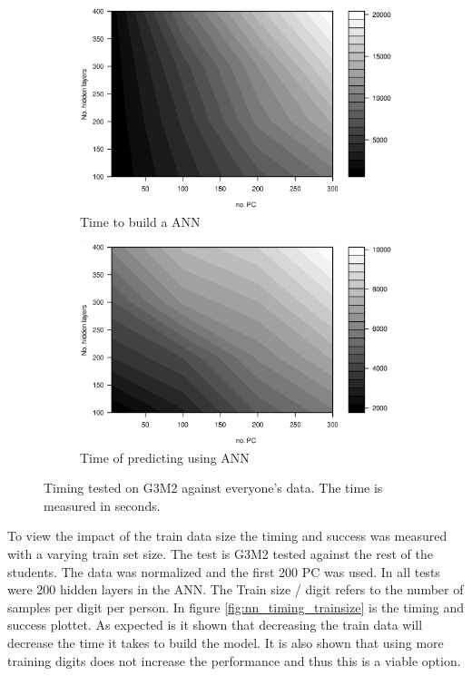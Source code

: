 \begin{figure}[h]
    \begin{subfigure}{0.49\textwidth}
    \centering
        \includegraphics[width=\textwidth]{graphics/contour_nn_size_vs_pca_model}
        \caption{Time to build a ANN}
        \label{fig:contour_nn_size_vs_pca_time_model}
    \end{subfigure}
    \begin{subfigure}{0.49\textwidth}
        \includegraphics[width=\textwidth]{graphics/contour_nn_size_vs_pca_predict}
        \caption{Time of predicting using ANN}
        \label{fig:contour_nn_size_vs_pca_time_predict}
    \end{subfigure}
    \caption{Timing tested on G3M2 against everyone's data. The time is measured in seconds.}
    \label{fig:contour_nn_both}
\end{figure}

To view the impact of the train data size the timing and success was measured with a varying train set size.
The test is G3M2 tested against the rest of the students.
The data was normalized and the first 200 PC was used.
In all tests were 200 hidden layers in the ANN.
The Train size / digit refers to the number of samples per digit per person.
In figure \ref{fig:nn_timing_trainsize} is the timing and success plottet.
As expected is it shown that decreasing the train data will decrease the time it takes to build the model.
It is also shown that using more training digits does not increase the performance and thus this is a viable option.

